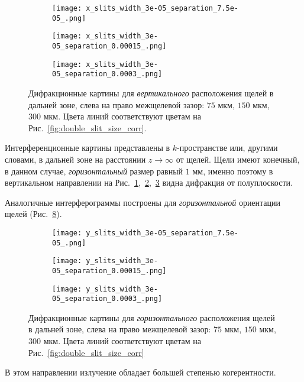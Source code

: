 \begin{figure}[H]
	\centering
	\begin{subfigure}{0.33\textwidth}
		\centering
		\texttt{[image: x\_slits\_width\_3e-05\_separation\_7.5e-05\_.png]}
		\caption{}
		\label{fig:x_slits_75}
	\end{subfigure}
	\begin{subfigure}{0.33\textwidth}
		\centering
		\texttt{[image: x\_slits\_width\_3e-05\_separation\_0.00015\_.png]}
		\caption{}
		\label{fig:x_slits_150}
	\end{subfigure}\hfill
	\begin{subfigure}{0.33\textwidth}
		\centering
		\texttt{[image: x\_slits\_width\_3e-05\_separation\_0.0003\_.png]}
		\caption{}
		\label{fig:x_slits_300}
	\end{subfigure}
	\caption{Дифракционные картины для \textit{вертикального} расположения щелей в дальней зоне, слева на право межщелевой зазор: $75$ мкм, $150$ мкм, $300$ мкм. Цвета линий соответствуют цветам на Рис.~\ref{fig:double_slit_size_corr}.}
	\label{fig:x_slits}
\end{figure}
\noindent Интерференционные картины представлены в $k$-пространстве или, другими словами, в дальней зоне на расстоянии $z \to \infty$ от щелей. Щели имеют конечный, в данном случае, \textit{горизонтальный} размер равный $1$ мм, именно поэтому в вертикальном направлении на Рис.~\ref{fig:x_slits_75},~\ref{fig:x_slits_150},~\ref{fig:x_slits_300} видна дифракция от полуплоскости.

Аналогичные интерферограммы построены для \textit{горизонтальной} ориентации щелей (Рис.~\ref{fig:y_slits}).
\begin{figure}[H]
	\centering
	\begin{subfigure}{0.33\textwidth}
		\centering
		\texttt{[image: y\_slits\_width\_3e-05\_separation\_7.5e-05\_.png]}
		\caption{}
		\label{fig:y_slits_75}
	\end{subfigure}
	\begin{subfigure}{0.33\textwidth}
		\centering
		\texttt{[image: y\_slits\_width\_3e-05\_separation\_0.00015\_.png]}
		\caption{}
		\label{fig:y_slits_150}
	\end{subfigure}\hfill
	\begin{subfigure}{0.33\textwidth}
		\centering
		\texttt{[image: y\_slits\_width\_3e-05\_separation\_0.0003\_.png]}
		\caption{}
		\label{fig:y_slits_300}
	\end{subfigure}
	\caption{Дифракционные картины для \textit{горизонтального} расположения щелей в дальней зоне, слева на право межщелевой зазор: $75$ мкм, $150$ мкм, $300$ мкм. Цвета линий соответствуют цветам на Рис.~\ref{fig:double_slit_size_corr}}
	\label{fig:y_slits}
\end{figure}
\noindent В этом направлении излучение обладает большей степенью когерентности.

